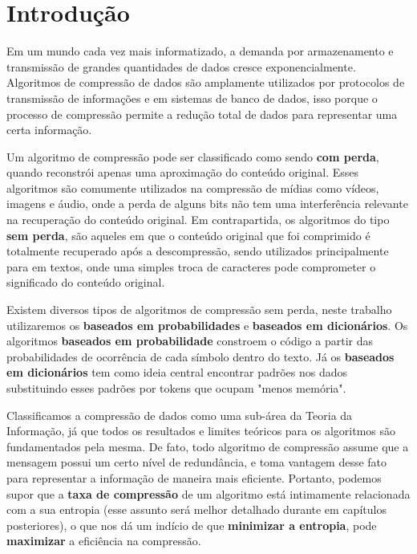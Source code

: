 
\chapter*[Introdução]{Introdução}

Em um mundo cada vez mais informatizado, a demanda por armazenamento e transmissão de grandes quantidades de dados cresce exponencialmente.  
Algoritmos de compressão de dados são amplamente utilizados por protocolos de transmissão de informações e em sistemas de banco de dados, isso porque o processo de compressão permite a redução total de dados para representar uma certa informação.

Um algoritmo de compressão pode ser classificado como sendo \textbf{com perda}, quando reconstrói apenas uma aproximação do conteúdo original. 
Esses algoritmos são comumente utilizados na compressão de mídias como vídeos, imagens e áudio, onde a perda de alguns bits não tem uma interferência relevante na recuperação do conteúdo original. 
Em contrapartida, os algoritmos do tipo \textbf{sem perda}, são aqueles em que o conteúdo original que foi comprimido é totalmente recuperado após a descompressão, sendo utilizados principalmente para em textos, onde uma simples troca de caracteres pode comprometer o significado do conteúdo original. 

Existem diversos tipos de algoritmos de compressão sem perda, neste trabalho utilizaremos os \textbf{baseados em probabilidades} e \textbf{baseados em dicionários}. 
Os algoritmos \textbf{baseados em probabilidade} constroem o código a partir das probabilidades de ocorrência de cada símbolo dentro do texto. 
Já os \textbf{baseados em dicionários} tem como ideia central encontrar padrões nos dados substituindo esses padrões por tokens que ocupam "menos memória".

Classificamos a compressão de dados como uma sub-área da Teoria da Informação, já que todos os resultados e limites teóricos para os algoritmos são fundamentados pela mesma. 
De fato, todo algoritmo de compressão assume que a mensagem possui um certo nível de redundância, e toma vantagem desse fato para representar a informação de maneira mais eficiente. 
Portanto, podemos supor que a \textbf{taxa de compressão} de um algoritmo está intimamente relacionada com a sua entropia (esse assunto será melhor detalhado durante em capítulos posteriores), o que nos dá um indício de que \textbf{minimizar a entropia}, pode \textbf{maximizar} a eficiência na compressão.

